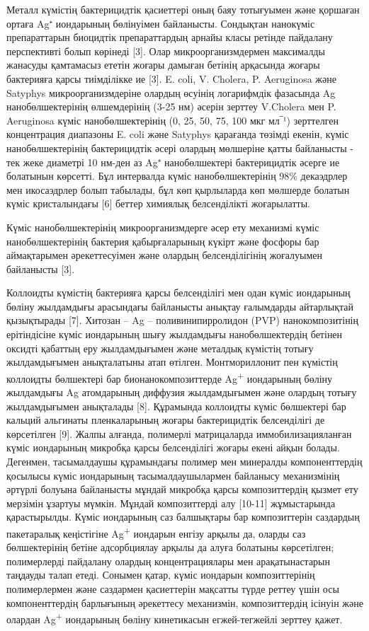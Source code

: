 Металл күмістің бактерицидтік қасиеттері оның баяу тотығуымен және
қоршаған ортаға Ag⁺ иондарының бөлінуімен байланысты. Сондықтан
нанокүміс препараттарын биоцидтік препараттардың арнайы класы ретінде
пайдалану перспективті болып көрінеді {[}3{]}. Олар микроорганизмдермен
максималды жанасуды қамтамасыз ететін жоғары дамыған бетінің арқасында
жоғары бактерияға қарсы тиімділікке ие {[}3{]}. E. coli, V. Cholera, P.
Aeruginosa және Satyphys микроорганизмдеріне олардың өсуінің логарифмдік
фазасында Ag нанобөлшектерінің өлшемдерінің (3-25 нм) әсерін зерттеу
V.Cholera мен P. Aeruginosa күміс нанобөлшектерінің (0, 25, 50, 75, 100
мкг мл‾¹) зерттелген концентрация диапазоны E. coli және Satyphys
қарағанда төзімді екенін, күміс нанобөлшектерінің бактерицидтік әсері
олардың мөлшеріне қатты байланысты - тек жеке диаметрі 10 нм-ден аз Ag⁺
нанобөлшектері бактерицидтік әсерге ие болатынын көрсетті. Бұл
интервалда күміс нанобөлшектерінің 98\% декаэдрлер мен икосаэдрлер болып
табылады, бұл көп қырлыларда көп мөлшерде болатын күміс кристалындағы
{[}6{]} беттер химиялық белсенділікті жоғарылатты.

Күміс нанобөлшектерінің микроорганизмдерге әсер ету механизмі күміс
нанобөлшектерінің бактерия қабырғаларының күкірт және фосфоры бар
аймақтарымен әрекеттесуімен және олардың белсенділігінің жоғалуымен
байланысты {[}3{]}.

Коллоидты күмістің бактерияға қарсы белсенділігі мен одан күміс
иондарының бөліну жылдамдығы арасындағы байланысты анықтау ғалымдарды
айтарлықтай қызықтырады {[}7{]}. Хитозан -- Ag -- поливинипирролидон
(PVP) нанокомпозитінің ерітіндісіне күміс иондарының шығу жылдамдығы
нанобөлшектердің бетінен оксидті қабаттың еру жылдамдығымен және
металдық күмістің тотығу жылдамдығымен анықталатыны атап өтілген.
Монтмориллонит пен күмістің коллоидты бөлшектері бар
бионанокомпозиттерде Ag\textsuperscript{+} иондарының бөліну жылдамдығы
Ag атомдарының диффузия жылдамдығымен және олардың тотығу жылдамдығымен
анықталады {[}8{]}. Құрамында коллоидты күміс бөлшектері бар кальций
альгинаты пленкаларының жоғары бактерицидтік белсенділігі де көрсетілген
{[}9{]}. Жалпы алғанда, полимерлі матрицаларда иммобилизацияланған күміс
иондарының микробқа қарсы белсенділігі жоғары екені айқын болады.
Дегенмен, тасымалдаушы құрамындағы полимер мен минералды компоненттердің
қосылысы күміс иондарының тасымалдаушылармен байланысу механизмінің
әртүрлі болуына байланысты мұндай микробқа қарсы композиттердің қызмет
ету мерзімін ұзартуы мүмкін. Мұндай композиттерді алу {[}10-11{]}
жұмыстарында қарастырылды. Күміс иондарының саз балшықтары бар
композиттерін саздардың пакетаралық кеңістігіне Ag\textsuperscript{+}
иондарын енгізу арқылы да, оларды саз бөлшектерінің бетіне адсорбциялау
арқылы да алуға болатыны көрсетілген; полимерлерді пайдалану олардың
концентрациялары мен арақатынастарын таңдауды талап етеді. Сонымен
қатар, күміс иондарын композиттерінің полимерлермен және саздармен
қасиеттерін мақсатты түрде реттеу үшін осы компоненттердің барлығының
әрекеттесу механизмін, композиттердің ісінуін және олардан
Ag\textsuperscript{+} иондарының бөліну кинетикасын егжей-тегжейлі
зерттеу қажет.

